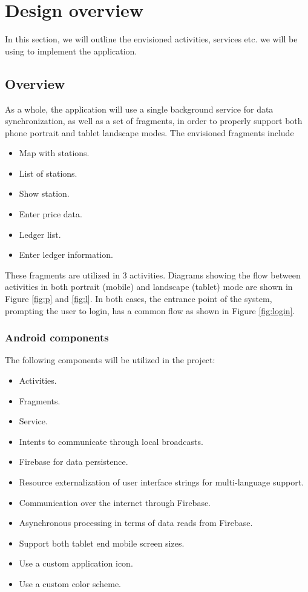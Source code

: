 
\chapter{Design overview}
In this section, we will outline the envisioned activities, services etc. we will be using to implement the application.

\section{Overview}
As a whole, the application will use a single background service for data synchronization, as well as a set of fragments, in order to properly support both phone portrait and tablet landscape modes. The envisioned fragments include
\begin{itemize}
	\item Map with stations.
	\item List of stations.
	\item Show station.
	\item Enter price data.
	\item Ledger list.
	\item Enter ledger information.
\end{itemize}

These fragments are utilized in 3 activities.  Diagrams showing the flow between activities in both portrait (mobile) and landscape (tablet) mode are shown in Figure \ref{fig:p} and \ref{fig:l}. In both cases, the entrance point of the system, prompting the user to login, has a common flow as shown in Figure \ref{fig:login}.

\subsection{Android components}
The following components will be utilized in the project:
\begin{itemize}
	\item Activities.
	\item Fragments.
	\item Service.
	\item Intents to communicate through local broadcasts.
	\item Firebase for data persistence.
	\item Resource externalization of user interface strings for multi-language support.
	\item Communication over the internet through Firebase.
	\item Asynchronous processing in terms of data reads from Firebase.
	\item Support both tablet end mobile screen sizes.
	\item Use a custom application icon.
	\item Use a custom color scheme.
\end{itemize}

